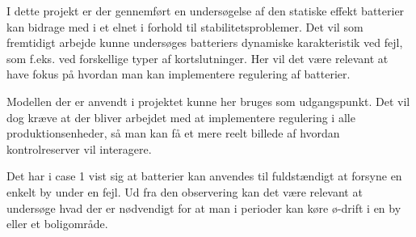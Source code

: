 
\label{FremtidigtArbejde}

I dette projekt er der gennemført en undersøgelse af den statiske effekt batterier kan bidrage med i et elnet i forhold til stabilitetsproblemer. Det vil som fremtidigt arbejde kunne undersøges batteriers dynamiske karakteristik ved fejl, som f.eks. ved forskellige typer af kortslutninger. Her vil det være relevant at have fokus på hvordan man kan implementere regulering af batterier.

Modellen der er anvendt i projektet kunne her bruges som udgangspunkt. Det vil dog kræve at der bliver arbejdet med at implementere regulering i alle produktionsenheder, så man kan få et mere reelt billede af hvordan kontrolreserver vil interagere.

Det har i case 1 vist sig at batterier kan anvendes til fuldstændigt at forsyne en enkelt by under en fejl. Ud fra den observering kan det være relevant at undersøge hvad der er nødvendigt for at man i perioder kan køre ø-drift i en by eller et boligområde.

